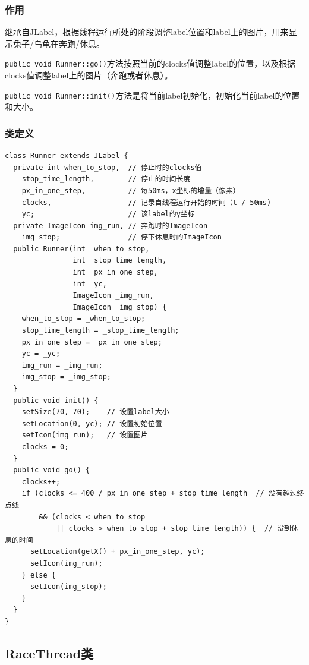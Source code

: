 \documentclass[11pt, a4paper]{article}
\begin{document}
\begin{CJK*}{UTF8}{gbsn}
\begin{lstlisting}
  \end{lstlisting}
  
  \subsubsection{作用}

  继承自JLabel，根据线程运行所处的阶段调整label位置和label上的图片，用来显示兔子/乌龟在奔跑/休息。

  \lstinline$public void Runner::go()$方法按照当前的clocks值调整label的位置，以及根据clocks值调整label上的图片（奔跑或者休息）。

  \lstinline$public void Runner::init()$方法是将当前label初始化，初始化当前label的位置和大小。
  
  \subsubsection{类定义}
  \begin{lstlisting}
class Runner extends JLabel {
  private int when_to_stop,  // 停止时的clocks值
    stop_time_length,        // 停止的时间长度
    px_in_one_step,          // 每50ms，x坐标的增量（像素）
    clocks,                  // 记录自线程运行开始的时间（t / 50ms)
    yc;                      // 该label的y坐标
  private ImageIcon img_run, // 奔跑时的ImageIcon
    img_stop;                // 停下休息时的ImageIcon
  public Runner(int _when_to_stop,
                int _stop_time_length,
                int _px_in_one_step,
                int _yc,
                ImageIcon _img_run,
                ImageIcon _img_stop) {
    when_to_stop = _when_to_stop;
    stop_time_length = _stop_time_length;
    px_in_one_step = _px_in_one_step;
    yc = _yc;
    img_run = _img_run;
    img_stop = _img_stop;
  }
  public void init() {
    setSize(70, 70);    // 设置label大小
    setLocation(0, yc); // 设置初始位置
    setIcon(img_run);   // 设置图片
    clocks = 0;          
  }
  public void go() {
    clocks++;
    if (clocks <= 400 / px_in_one_step + stop_time_length  // 没有越过终点线
        && (clocks < when_to_stop                          
            || clocks > when_to_stop + stop_time_length)) {  // 没到休息的时间
      setLocation(getX() + px_in_one_step, yc);
      setIcon(img_run);
    } else {
      setIcon(img_stop);
    } 
  }
}
  \end{lstlisting}

  \subsection{RaceThread类}


\end{CJK*}
\end{document}
